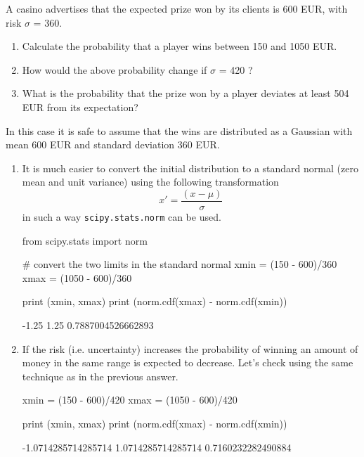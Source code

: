 \begin{question}
A casino advertises that the expected prize won by its clients is 600 EUR, with risk $\sigma$ = 360.
\begin{enumerate}[label={\emph{\alph*})}]
\tightlist
\item Calculate the probability that a player wins between 150 and 1050 EUR.
\item How would the above probability change if $\sigma$ = 420 ?
\item What is the probability that the prize won by a player deviates at least 504 EUR from its expectation?
\end{enumerate}
\end{question}

\cprotEnv\begin{solution}
In this case it is safe to assume that the wins are distributed as a Gaussian with mean 600 EUR and standard deviation 360 EUR. 
\begin{enumerate}[label={\emph{\alph*})}]
\tightlist
\item It is much easier to convert the initial distribution to a standard normal (zero mean and unit variance) using the following transformation
\begin{equation*}
x' = \frac{(x - \mu)}{\sigma}
\end{equation*}
in such a way \texttt{scipy.stats.norm} can be used.

\begin{ipython}
from scipy.stats import norm

# convert the two limits in the standard normal
xmin = (150 - 600)/360
xmax = (1050 - 600)/360

print (xmin, xmax)
print (norm.cdf(xmax) - norm.cdf(xmin))
\end{ipython}
\begin{ioutput}
-1.25 1.25
0.7887004526662893
\end{ioutput}

\item If the risk (i.e. uncertainty) increases the probability of winning an amount of money in the same range is expected to decrease. Let's check using the same technique as in the previous answer.
\begin{ipython}
xmin = (150 - 600)/420
xmax = (1050 - 600)/420

print (xmin, xmax)
print (norm.cdf(xmax) - norm.cdf(xmin))
\end{ipython}
\begin{ioutput}
-1.0714285714285714 1.0714285714285714
0.7160232282490884
\end{ioutput}


\end{enumerate}
\end{solution}
